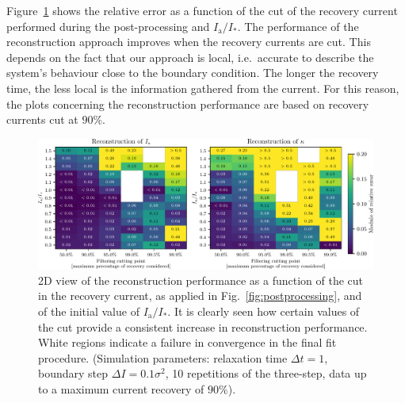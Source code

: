 Figure~\ref{fig:different_cut} shows the relative error as a function of the cut of the recovery current performed during the post-processing and $I_\mathrm{a}/I_\ast$. The performance of the reconstruction approach improves when the recovery currents are cut. This depends on the fact that our approach is local, i.e.\ accurate to describe the system's behaviour close to the boundary condition. The longer the recovery time, the less local is the information gathered from the current. For this reason, the plots concerning the reconstruction performance are based on recovery currents cut at $90\%$. 

\begin{figure}[htp]
    \centering
    \includegraphics[width=\textwidth]{4_probing_the_diffusive_behavior/figs/final/MULTI_different_filter.pdf}
    \caption{2D view of the reconstruction performance as a function of the cut in the recovery current, as applied in Fig.~\ref{fig:postprocessing}, and of the initial value of $I_\mathrm{a}/I_\ast$. It is clearly seen how certain values of the cut provide a consistent increase in reconstruction performance. White regions indicate a failure in convergence in the final fit procedure. (Simulation parameters: relaxation time $\Delta t=1$, boundary step $\Delta I=0.1 \sigma^2$, 10 repetitions of the three-step, data up to a maximum current recovery of $90\%$).}
    \label{fig:different_cut}
\end{figure}

